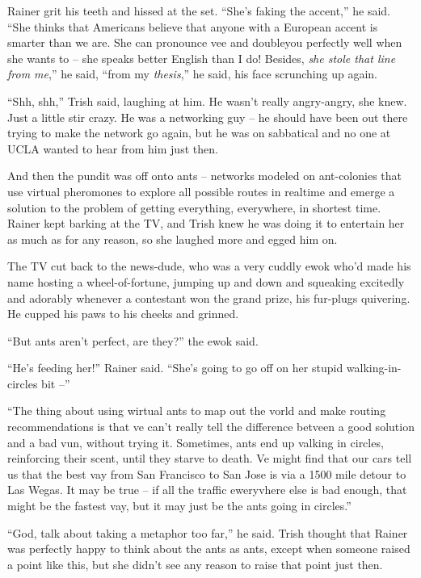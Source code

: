 Rainer grit his teeth and hissed at the set. “She's faking the 
accent,” he said. “She thinks that Americans believe that anyone 
with a European accent is smarter than we are. She can pronounce vee 
and doubleyou perfectly well when she wants to -- she speaks better 
English than I do! Besides, \emph{she stole that line from me},” he 
said, “from my \emph{thesis},” he said, his face scrunching up 
again.

“Shh, shh,” Trish said, laughing at him. He wasn't really 
angry-angry, she knew. Just a little stir crazy. He was a networking 
guy -- he should have been out there trying to make the network go 
again, but he was on sabbatical and no one at UCLA wanted to hear from 
him just then.

And then the pundit was off onto ants -- networks modeled on 
ant-colonies that use virtual pheromones to explore all possible routes 
in realtime and emerge a solution to the problem of getting everything, 
everywhere, in shortest time. Rainer kept barking at the TV, and Trish 
knew he was doing it to entertain her as much as for any reason, so she 
laughed more and egged him on.

The TV cut back to the news-dude, who was a very cuddly ewok who'd made 
his name hosting a wheel-of-fortune, jumping up and down and squeaking 
excitedly and adorably whenever a contestant won the grand prize, his 
fur-plugs quivering. He cupped his paws to his cheeks and grinned.

“But ants aren't perfect, are they?” the ewok said.

“He's feeding her!” Rainer said. “She's going to go off on her 
stupid walking-in-circles bit --”

“The thing about using wirtual ants to map out the vorld and make 
routing recommendations is that ve can't really tell the difference 
betveen a good solution and a bad vun, without trying it. Sometimes, 
ants end up valking in circles, reinforcing their scent, until they 
starve to death. Ve might find that our cars tell us that the best vay 
from San Francisco to San Jose is via a 1500 mile detour to Las Wegas. 
It may be true -- if all the traffic eweryvhere else is bad enough, 
that might be the fastest vay, but it may just be the ants going in 
circles.”

“God, talk about taking a metaphor too far,” he said. Trish thought 
that Rainer was perfectly happy to think about the ants as ants, except 
when someone raised a point like this, but she didn't see any reason to 
raise that point just then.

